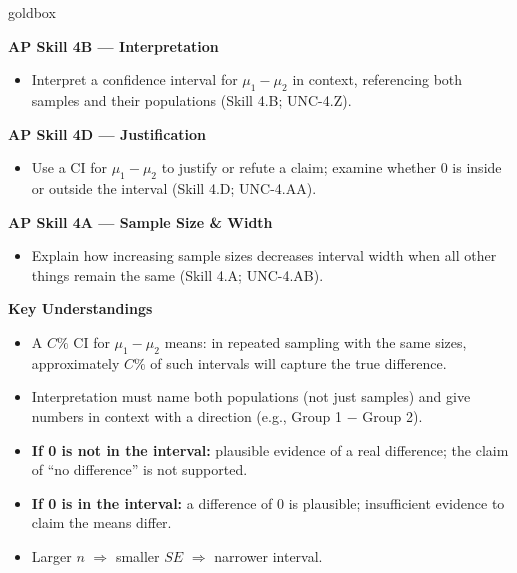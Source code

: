 \documentclass[10pt]{article}
\begin{document}
\begin{skillbox}{goldbox}
\begin{minipage}[t]{0.48\linewidth}
    \textbf{AP Skill 4B --- Interpretation}
    \begin{itemize}
        \item Interpret a confidence interval for $\mu_1 - \mu_2$ in context, referencing
              both samples and their populations (Skill 4.B; UNC-4.Z).
    \end{itemize}
    \textbf{AP Skill 4D --- Justification}
    \begin{itemize}
        \item Use a CI for $\mu_1 - \mu_2$ to justify or refute a claim; examine whether
              0 is inside or outside the interval (Skill 4.D; UNC-4.AA).
    \end{itemize}
    \textbf{AP Skill 4A --- Sample Size \& Width}
    \begin{itemize}
        \item Explain how increasing sample sizes decreases interval width when all other
              things remain the same (Skill 4.A; UNC-4.AB).
    \end{itemize}
\end{minipage}
\hfill
\begin{minipage}[t]{0.48\linewidth}
    \textbf{Key Understandings}
    \begin{itemize}
        \item A $C\%$ CI for $\mu_1 - \mu_2$ means: in repeated sampling with the same
              sizes, approximately $C\%$ of such intervals will capture the true difference.
        \item Interpretation must name both populations (not just samples) and give
              numbers in context with a direction (e.g., Group 1 $-$ Group 2).
        \item \textbf{If 0 is not in the interval:} plausible evidence of a real difference;
              the claim of ``no difference'' is not supported.
        \item \textbf{If 0 is in the interval:} a difference of 0 is plausible; insufficient
              evidence to claim the means differ.
        \item Larger $n$ $\Rightarrow$ smaller $SE$ $\Rightarrow$ narrower interval.
    \end{itemize}
\end{minipage}
\end{skillbox}
\end{document}
